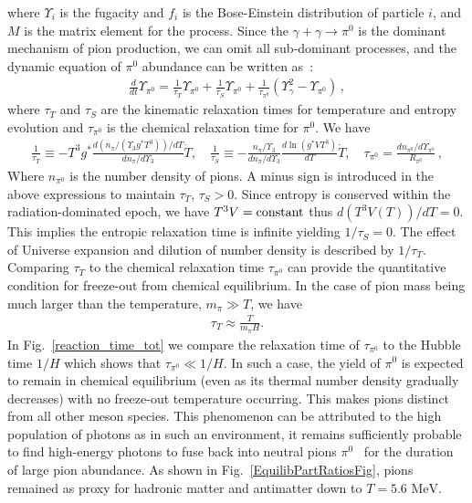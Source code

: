 \documentclass[universe,article,submit,moreauthors,pdftex,a4paper]{Definitions/mdpi}
\newcommand{\MeV}{\text{ MeV}}
\newcommand*{\rf}[1]{Fig.~{\ref{#1}}}
\newcommand*{\xblue}{\color{blue}}
\begin{document}
where $\Upsilon_i$ is the fugacity and $f_{i}$ is the Bose-Einstein distribution of particle $i$, and $M$ is the matrix element for the process. Since the $\gamma+\gamma\to \pi^0$ is the dominant mechanism of pion production, we can omit all sub-dominant processes, and the dynamic equation of $\pi^0$ abundance can be written as~\cite{Fromerth:2012fe}:
\begin{align}
\frac{d}{dt}\Upsilon_{\pi^0}=\frac{1}{\tau_T}\Upsilon_{\pi^0}+\frac{1}{\tau_S}\Upsilon_{\pi^0}+\frac{1}{\tau_{\pi^0}}\left(\Upsilon^2_\gamma-\Upsilon_{\pi^0}\right)\,,
\end{align}
where $\tau_T$ and $\tau_S$ are the kinematic relaxation times for temperature and entropy evolution and $\tau_{\pi^0}$ is the chemical relaxation time for $\pi^0$. We have
\begin{align}
\frac{1}{\tau_T}\equiv -T^3g^*\frac{d (n_{\pi}/(\Upsilon_3
g^*T^3))/dT}{dn_{\pi}/d{\Upsilon_3}}{\dot T},\label{tauT} \quad
\frac{1}{\tau_{S}}\equiv
-\frac{n_{\pi}/\Upsilon_3}{dn_{\pi}/d{\Upsilon_3}}\frac{d\ln (g^*VT^3)}{dT}
\dot{T},\quad
\tau_{\pi^0}=\frac{dn_{\pi^0}/d\Upsilon_{\pi^0}}{R_{\pi^0}}\,,
\end{align}
Where $n_{\pi^0}$ is the number density of pions. A minus sign is introduced in the above expressions to maintain $\tau_T$, $\tau_S>0$. Since entropy is conserved within the radiation-dominated epoch, we have $T^{3}V={\rm constant}$ thus $d(T^3V(T))/dT=0$. This implies the entropic relaxation time is infinite yielding $1/\tau_S=0$. The effect of Universe expansion and dilution of number density is described by $1/\tau_T$. Comparing $\tau_T$ to the chemical relaxation time $\tau_{\pi^0}$ can provide the quantitative condition for freeze-out from chemical equilibrium. In the case of pion mass being much larger than the temperature, $m_{\pi}\gg T$, we have~\cite{Kuznetsova:2009xh}
\begin{align}
\tau_T\approx\frac{T}{m_{\pi}H}.
\end{align}
 In \rf{reaction_time_tot} we compare the relaxation time of $\tau_{\pi^0}$ to the Hubble time $1/H$ which shows that $\tau_{\pi^0}\ll 1/H$. In such a case, the yield of $\pi^0$ is expected to remain in chemical equilibrium (even as its thermal number density gradually decreases) with no freeze-out temperature occurring. This makes pions distinct from all other meson species. This phenomenon can be attributed to the high population of photons as in such an environment, it remains sufficiently probable to find high-energy photons to fuse back into neutral pions $\pi^0$~\cite{Fromerth:2012fe} for the duration of large pion abundance. As shown in \rf{EquilibPartRatiosFig},  {\xblue pions remained as proxy for hadronic matter and antimatter down to} $T=5.6\MeV$.
\end{document}
